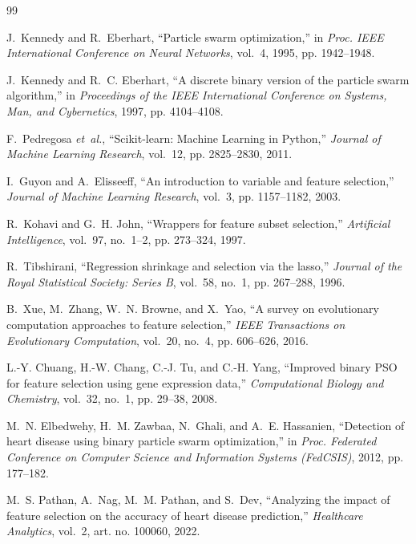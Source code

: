 \documentclass[conference]{IEEEtran}
\begin{document}
\begin{thebibliography}{99}

J.~Kennedy and R.~Eberhart, ``Particle swarm optimization,'' in \emph{Proc.
IEEE International Conference on Neural Networks}, vol.~4, 1995,
pp. 1942--1948.

J.~Kennedy and R.~C. Eberhart, ``A discrete binary version of the particle
swarm algorithm,'' in \emph{Proceedings of the IEEE International Conference
on Systems, Man, and Cybernetics}, 1997, pp. 4104--4108.

F.~Pedregosa \emph{et~al.}, ``Scikit-learn: Machine Learning in Python,''
\emph{Journal of Machine Learning Research}, vol.~12, pp. 2825--2830, 2011.

I.~Guyon and A.~Elisseeff, ``An introduction to variable and feature
selection,'' \emph{Journal of Machine Learning Research}, vol.~3,
pp. 1157--1182, 2003.

R.~Kohavi and G.~H. John, ``Wrappers for feature subset selection,''
\emph{Artificial Intelligence}, vol.~97, no.~1--2, pp. 273--324, 1997.

R.~Tibshirani, ``Regression shrinkage and selection via the lasso,''
\emph{Journal of the Royal Statistical Society: Series B}, vol.~58, no.~1,
pp. 267--288, 1996.

B.~Xue, M.~Zhang, W.~N. Browne, and X.~Yao, ``A survey on evolutionary
computation approaches to feature selection,'' \emph{IEEE Transactions on
Evolutionary Computation}, vol.~20, no.~4, pp. 606--626, 2016.

L.-Y. Chuang, H.-W. Chang, C.-J. Tu, and C.-H. Yang, ``Improved binary PSO
for feature selection using gene expression data,'' \emph{Computational
Biology and Chemistry}, vol.~32, no.~1, pp. 29--38, 2008.

M.~N. Elbedwehy, H.~M. Zawbaa, N.~Ghali, and A.~E. Hassanien, ``Detection of
heart disease using binary particle swarm optimization,'' in \emph{Proc.
Federated Conference on Computer Science and Information Systems (FedCSIS)},
2012, pp. 177--182.

M.~S. Pathan, A.~Nag, M.~M. Pathan, and S.~Dev, ``Analyzing the impact of
feature selection on the accuracy of heart disease prediction,''
\emph{Healthcare Analytics}, vol.~2, art. no. 100060, 2022.


\end{thebibliography}
\end{document}
